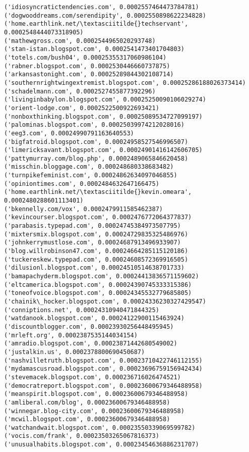 \documentclass[11pt]{article}
\begin{document}
\begin{Verbatim}[commandchars=\\\{\}]
('idiosyncratictendencies.com', 0.0002557464473784781)
('dogwooddreams.com/serendipity', 0.0002550898622234828)
('home.earthlink.net/\textasciitilde{}techservant', 0.0002548444073318905)
('mathewgross.com', 0.0002544965020293748)
('stan-istan.blogspot.com', 0.0002541473401704803)
('totels.com/bush04', 0.00025355317060986104)
('rabner.blogspot.com', 0.0002530446660737875)
('arkansastonight.com', 0.00025289844302108714)
('southernrightwingextremist.blogspot.com', 0.00025286188026373414)
('schadelmann.com', 0.0002527455877392296)
('livinginbabylon.blogspot.com', 0.00025250090106029274)
('orient-lodge.com', 0.0002522500922693421)
('nonboxthinking.blogspot.com', 0.00025089534727099197)
('palominas.blogspot.com', 0.00025039974212028016)
('eeg3.com', 0.00024990791163640553)
('bigfatroid.blogspot.com', 0.00024958527546996507)
('limericksavant.blogspot.com', 0.00024901416142606705)
('pattymurray.com/blog.php', 0.0002489065846620458)
('misschin.bloggage.com', 0.000248680338683482)
('turnpikefeminist.com', 0.00024862634097046855)
('opiniontimes.com', 0.0002484632647166475)
('home.earthlink.net/\textasciitilde{}kevin.omeara', 0.0002480288601113401)
('bkennelly.com/vox', 0.0002479911585462387)
('kevincourser.blogspot.com', 0.0002476772064377837)
('parabasis.typepad.com', 0.00024745384973507795)
('mixtersmix.blogspot.com', 0.00024729835325486976)
('johnkerrymustlose.com', 0.00024687913496933907)
('blog.willrobinson47.com', 0.00024664285115120186)
('tuckereskew.typepad.com', 0.00024608572369916505)
('dilusionl.blogspot.com', 0.00024510514638701733)
('bamapachyderm.blogspot.com', 0.00024413836571159602)
('eltcamerica.blogspot.com', 0.00024390745333315386)
('toneofvoice.blogspot.com', 0.00024345532779685805)
('chainik\_hocker.blogspot.com', 0.00024336230327429547)
('conniptions.net', 0.00024310940471844325)
('watdanook.blogspot.com', 0.00024122900115463924)
('discountblogger.com', 0.00023930256448495945)
('mrleft.org', 0.0002387535144034154)
('amradio.blogspot.com', 0.00023871442680549002)
('justalkin.us', 0.0002378800690450687)
('nashvilletruth.blogspot.com', 0.00023710422746112155)
('mydamascusroad.blogspot.com', 0.00023696759156942434)
('stevemacek.blogspot.com', 0.000236716026474521)
('democratreport.blogspot.com', 0.00023600679346488958)
('meanspirit.blogspot.com', 0.00023600679346488958)
('amliberal.com/blog', 0.00023600679346488958)
('winnegar.blog-city.com', 0.00023600679346488958)
('mcwil.blogspot.com', 0.00023600679346488958)
('watchandwait.blogspot.com', 0.00023550339069599782)
('vocis.com/frank', 0.00023503265067816373)
('unusualhabits.blogspot.com', 0.00023454636886231707)

\end{Verbatim}
\end{document}
